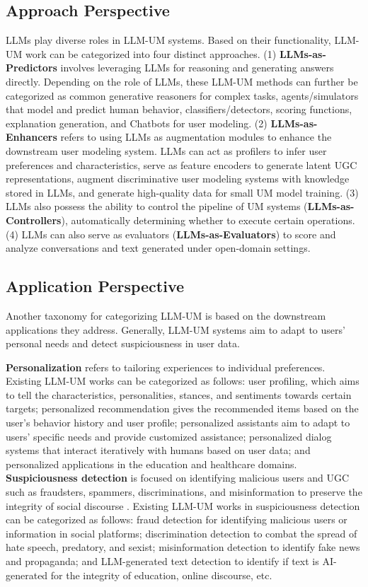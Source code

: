 \documentclass[11pt]{article}
\begin{document}
\subsection{Approach Perspective}
\label{sec:taxo_approach}
LLMs play diverse roles in LLM-UM systems. Based on their functionality, LLM-UM work can be categorized into four distinct approaches.
(1) \textbf{LLMs-as-Predictors} involves leveraging LLMs for reasoning and generating answers directly. Depending on the role of LLMs, these LLM-UM methods can further be categorized as common generative reasoners for complex tasks, agents/simulators that model and predict human behavior, classifiers/detectors, scoring functions, explanation generation, and Chatbots for user modeling. (2) \textbf{LLMs-as-Enhancers} refers to using LLMs as augmentation modules to enhance the downstream user modeling system. LLMs can act as profilers to infer user preferences and characteristics, serve as feature encoders to generate latent UGC representations, augment discriminative user modeling systems with knowledge stored in LLMs, and generate high-quality data for small UM model training. (3) LLMs also possess the ability to control the pipeline of UM systems (\textbf{LLMs-as-Controllers}), automatically determining whether to execute certain operations. (4) LLMs can also serve as evaluators (\textbf{LLMs-as-Evaluators}) to score and analyze conversations and text generated under open-domain settings.

\subsection{Application Perspective}
\label{sec:taxo_application}
Another taxonomy for categorizing LLM-UM is based on the downstream applications they address. Generally, LLM-UM systems aim to adapt to users' personal needs and detect suspiciousness in user data.

\textbf{Personalization} refers to tailoring experiences to individual preferences. Existing LLM-UM works can be categorized as follows: user profiling, which aims to tell the characteristics, personalities, stances, and sentiments towards certain targets; personalized recommendation gives the recommended items based on the user's behavior history and user profile; personalized assistants aim to adapt to users' specific needs and provide customized assistance; personalized dialog systems that interact iteratively with humans based on user data; and personalized applications in the education and healthcare domains. \textbf{Suspiciousness detection} is focused on identifying malicious users and UGC such as fraudsters, spammers, discriminations, and misinformation to preserve the integrity of social discourse \cite{jiang2016suspicious, tan2023botpercent}. Existing LLM-UM works in suspiciousness detection can be categorized as follows: fraud detection for identifying malicious users or information in social platforms; discrimination detection to combat the spread of hate speech, predatory, and sexist; misinformation detection to identify fake news and propaganda; and LLM-generated text detection to identify if text is AI-generated for the integrity of education, online discourse, etc.
\end{document}
